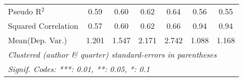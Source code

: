\begin{tabular}{lcccccc}
   Pseudo R$^2$                                               & 0.59    & 0.60    & 0.62    & 0.64    & 0.56    & 0.55\\  
   Squared Correlation                                        & 0.57    & 0.60    & 0.62    & 0.66    & 0.94    & 0.94\\  
Mean(Dep. Var.) & 1.201 & 1.547 & 2.171 & 2.742 & 1.088 & 1.168 \\
   \midrule \midrule
   \multicolumn{7}{l}{\emph{Clustered (author \& quarter) standard-errors in parentheses}}\\
   \multicolumn{7}{l}{\emph{Signif. Codes: ***: 0.01, **: 0.05, *: 0.1}}\\
\end{tabular}
\par\endgroup
